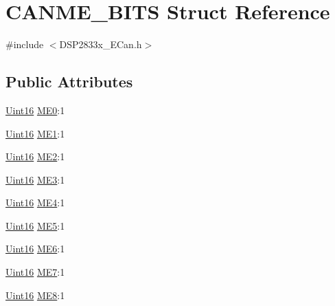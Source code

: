 \hypertarget{struct_c_a_n_m_e___b_i_t_s}{}\section{C\+A\+N\+M\+E\+\_\+\+B\+I\+T\+S Struct Reference}
\label{struct_c_a_n_m_e___b_i_t_s}


{\ttfamily \#include $<$D\+S\+P2833x\+\_\+\+E\+Can.\+h$>$}

\subsection*{Public Attributes}
\begin{DoxyCompactItemize}
\item 
\hyperlink{_d_s_p2833x___device_8h_a59a9f6be4562c327cbfb4f7e8e18f08b}{Uint16} \hyperlink{struct_c_a_n_m_e___b_i_t_s_a92911d210693a251b4249be974ada8c4}{M\+E0}\+:1
\item 
\hyperlink{_d_s_p2833x___device_8h_a59a9f6be4562c327cbfb4f7e8e18f08b}{Uint16} \hyperlink{struct_c_a_n_m_e___b_i_t_s_a549c68f9d3dd6d940e68ce01efe29325}{M\+E1}\+:1
\item 
\hyperlink{_d_s_p2833x___device_8h_a59a9f6be4562c327cbfb4f7e8e18f08b}{Uint16} \hyperlink{struct_c_a_n_m_e___b_i_t_s_acb05ec92feaaf148f6819f91e90bdd19}{M\+E2}\+:1
\item 
\hyperlink{_d_s_p2833x___device_8h_a59a9f6be4562c327cbfb4f7e8e18f08b}{Uint16} \hyperlink{struct_c_a_n_m_e___b_i_t_s_a400cc0929f0af6b7717ecb54357662cb}{M\+E3}\+:1
\item 
\hyperlink{_d_s_p2833x___device_8h_a59a9f6be4562c327cbfb4f7e8e18f08b}{Uint16} \hyperlink{struct_c_a_n_m_e___b_i_t_s_a93c8e674a5aa6d73205ea5be4fd2eaaf}{M\+E4}\+:1
\item 
\hyperlink{_d_s_p2833x___device_8h_a59a9f6be4562c327cbfb4f7e8e18f08b}{Uint16} \hyperlink{struct_c_a_n_m_e___b_i_t_s_af10ab2866e632e483c01e1f06c43e9e0}{M\+E5}\+:1
\item 
\hyperlink{_d_s_p2833x___device_8h_a59a9f6be4562c327cbfb4f7e8e18f08b}{Uint16} \hyperlink{struct_c_a_n_m_e___b_i_t_s_ac36ec301bd31658c9b44c813b00f0e1d}{M\+E6}\+:1
\item 
\hyperlink{_d_s_p2833x___device_8h_a59a9f6be4562c327cbfb4f7e8e18f08b}{Uint16} \hyperlink{struct_c_a_n_m_e___b_i_t_s_a2737948fdab5d48616351f3dd3c9f9e9}{M\+E7}\+:1
\item 
\hyperlink{_d_s_p2833x___device_8h_a59a9f6be4562c327cbfb4f7e8e18f08b}{Uint16} \hyperlink{struct_c_a_n_m_e___b_i_t_s_a2cadabf48002c9b2359d7479ca7ea4cf}{M\+E8}\+:1

\end{DoxyCompactItemize}
